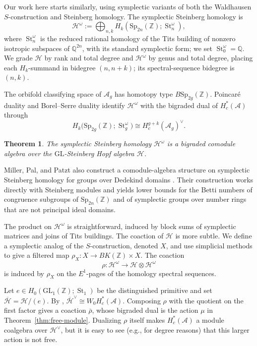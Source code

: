 \documentclass[12 pt]{amsart}
\newcommand{\QQ}{\mathbb{Q}}
\newcommand{\ZZ}{\mathbb{Z}}
\newcommand{\cA}{\mathcal{A}}
\newcommand{\cH}{\mathcal{H}}
\newcommand{\Sp}{\mathrm{Sp}}
\newcommand{\St}{\operatorname{St}}
\newcommand{\GL}{\mathrm{GL}}
\newcommand{\<}{\langle}
\renewcommand{\>}{\rangle}
\newtheorem{theorem}{Theorem}[section]
\theoremstyle{definition}
\begin{document}
Our work here starts similarly, using symplectic variants of both the Waldhausen $S$-construction and Steinberg homology. The symplectic Steinberg homology is
\[
\cH^\omega := \bigoplus_{n, k} H_k(\Sp_{2n}(\ZZ); \St_n^\omega),
\]
where $\St_n^\omega$ is the reduced rational homology of the Tits building of nonzero isotropic subspaces of $\QQ^{2n}$, with its standard symplectic form; we set $\St_0^\omega = \QQ$. We grade $\cH$ by rank and total degree and $\cH^\omega$ by genus and total degree, placing each $H_k$-summand in bidegree $(n, n + k)$; its spectral-sequence bidegree is $(n, k)$.

The orbifold classifying space of $\cA_g$ has homotopy type $B \Sp_{2g}(\ZZ)$. Poincar\'e duality and Borel--Serre duality identify $\cH^\omega$ with the bigraded dual of $H_c^*(\cA)$ through
\[
H_k\bigl(\Sp_{2g}(\ZZ); \St_g^\omega\bigr) \cong H_c^{g + k}(\cA_g)^\vee.
\]

\begin{theorem}\label{thm:main}
The symplectic Steinberg homology $\cH^\omega$ is a bigraded comodule algebra over the $\GL$-Steinberg Hopf algebra $\cH$.
\end{theorem}

\noindent Miller, Pal, and Patzt also construct a comodule-algebra structure on symplectic Steinberg homology for groups over Dedekind domains \cite[Theorem~1.1]{MPP}. Their construction works directly with Steinberg modules and yields lower bounds for the Betti numbers of congruence subgroups of $\Sp_{2n}(\ZZ)$ and of symplectic groups over number rings that are not principal ideal domains.

The product on $\cH^\omega$ is straightforward, induced by block sums of symplectic matrices and joins of Tits buildings. The coaction of $\cH$ is more subtle. We define a symplectic analog of the $S$-construction, denoted $X$, and use simplicial methods to give a filtered map $\rho_X \colon X \to BK(\ZZ) \times X$. The coaction
\[
\rho \colon \cH^\omega \to \cH \otimes \cH^\omega
\]
is induced by $\rho_X$ on the $E^1$-pages of the homology spectral sequences.

Let $e \in H_0(\GL_1(\ZZ); \St_1)$ be the distinguished primitive and set $\overline{\cH} = \cH/(e)$. By \cite{BCGP}, $\overline{\cH}^{\vee} \cong W_0 H_c^*(\cA)$. Composing $\rho$ with the quotient on the first factor gives a coaction $\bar \rho$, whose bigraded dual is the action $\mu$ in Theorem~\ref{thm:free-module}. Dualizing $\rho$ itself makes $H_c^*(\cA)$ a module coalgebra over $\cH^\vee$, but it is easy to see (e.g., for degree reasons) that this larger action is not free.
\end{document}
